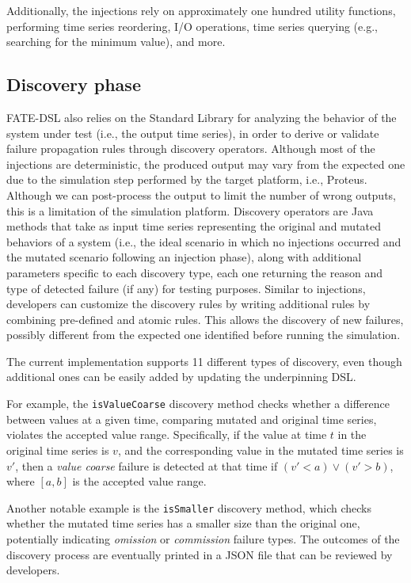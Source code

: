 Additionally, the injections rely on approximately one hundred utility functions, performing time series reordering, I/O operations, time series querying (e.g., searching for the minimum value), and more.






\subsection{Discovery phase}
FATE-DSL also relies on the Standard Library for analyzing the behavior of the system under test (i.e., the output time series), in order to derive or validate failure propagation rules through discovery operators.
Although most of the injections are deterministic, the produced output may vary from the expected one due to the simulation step performed by the target platform, i.e., Proteus. Although we can post-process the output to limit the number of wrong outputs, this is a limitation of the simulation platform. 
 Discovery operators are Java methods that take as input time series representing the original and mutated behaviors of a system (i.e., the ideal scenario in which no injections occurred and the mutated scenario following an injection phase), along with additional parameters specific to each discovery type, each one returning the reason and type of detected failure (if any) for testing purposes. Similar to injections, developers can customize the discovery rules by writing additional rules by combining pre-defined and atomic rules. This allows the discovery of new failures, possibly different from the expected one identified before running the simulation.   
 

The current implementation supports 11 different types of discovery, even though additional ones can be easily added by updating the underpinning DSL.

For example, the \texttt{isValueCoarse} discovery method checks whether a difference between values at a given time, comparing mutated and original time series, violates the accepted value range. Specifically, if the value at time $t$ in the original time series is $v$, and the corresponding value in the mutated time series is $v'$, then a \textit{value coarse} failure is detected at that time if $ (v' < a) \lor (v' > b) $, where $[a, b]$ is the accepted value range. 

Another notable example is the \texttt{isSmaller} discovery method, which checks whether the mutated time series has a smaller size than the original one, potentially indicating \textit{omission} or \textit{commission} failure types. The outcomes of the discovery process are eventually printed in a JSON file that can be reviewed by developers. 

